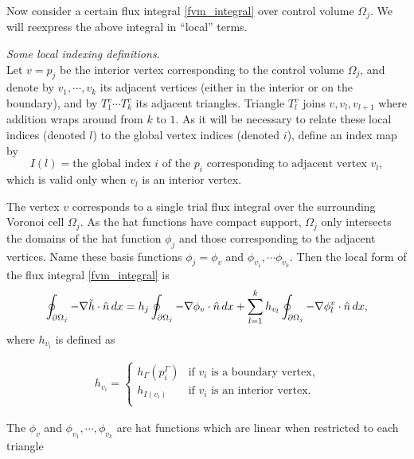 Now consider a certain flux integral \eqref{fvm_integral} over control volume $\Omega_j$. We will reexpress the above integral
in ``local'' terms.
\newcommand{\definelocalterms}[1]{
\begin{aside}
\textit{Some local indexing definitions.}\\
\vskip -0.1in
Let $v = p_j$ be the interior vertex corresponding to #1, and denote by $v_1, \cdots, v_k$ its adjacent vertices (either in the interior
or on the boundary), and by $T^v_1 \cdots T^v_k$ its adjacent triangles. Triangle $T^v_l$ joins $v,v_l,v_{l+1}$ where addition wraps around from $k$ to $1$.
As it will be necessary to relate these local indices (denoted $l$) to the global vertex indices (denoted $i$), define an index map by
    $$I(l) = \text{the global index $i$ of the $p_i$ corresponding to adjacent vertex $v_l$},$$
which is valid only when $v_l$ is an interior vertex.
\end{aside}
}
\definelocalterms{the control volume $\Omega_j$}
The vertex $v$ corresponds to a single trial flux integral over the surrounding Voronoi cell $\Omega_j$.
As the hat functions have compact support, $\Omega_j$ only intersects the domains of the hat function $\phi_j$ and those corresponding
to the adjacent vertices. Name these basis functions $\phi_j = \phi_v$ and $\phi_{v_1}, \cdots \phi_{v_k}$.
Then the local form of the flux integral \eqref{fvm_integral} is
\begin{equation}\label{fvm_integral_vertex}
    \oint_{{\partial\Omega}_j} -\nabla \tilde{h}\cdot\hat{n}\,dx = h_j\oint_{{\partial\Omega}_j}-\nabla\phi_v\cdot\hat{n}\,dx + \sum_{l=1}^{k}h_{v_l}\oint_{{\partial\Omega}_j}-\nabla\phi^v_l\cdot\hat{n}\,dx,
\end{equation}
where $h_{v_i}$ is defined as
\newcommand{\hvidefinition}{
\begin{align*}
    h_{v_i} =
    \left\{\begin{array}{lr}
        h_\Gamma(p^\Gamma_i) &\text{if $v_i$ is a boundary vertex,}\\
        h_{I(v_i)} &\text{if $v_i$ is an interior vertex}.\\
        \end{array}\right.
\end{align*}
}
\hvidefinition
The $\phi_v$ and $\phi_{v_1},\cdots,\phi_{v_k}$ are hat functions which are linear when restricted to each triangle
